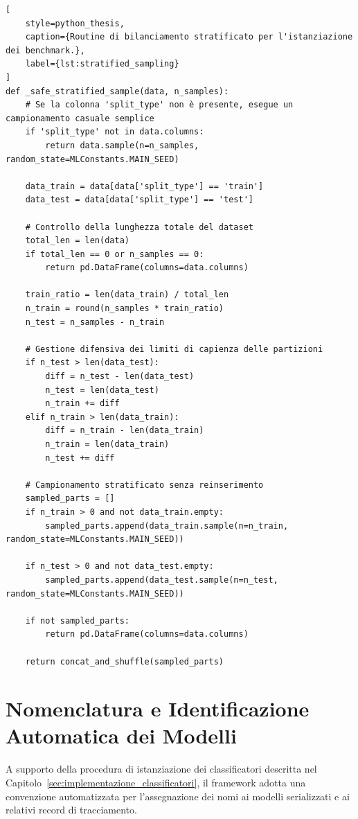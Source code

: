 \begin{lstlisting}[
    style=python_thesis,
    caption={Routine di bilanciamento stratificato per l'istanziazione dei benchmark.},
    label={lst:stratified_sampling}
]
def _safe_stratified_sample(data, n_samples):
    # Se la colonna 'split_type' non è presente, esegue un campionamento casuale semplice
    if 'split_type' not in data.columns:
        return data.sample(n=n_samples, random_state=MLConstants.MAIN_SEED)
    
    data_train = data[data['split_type'] == 'train']
    data_test = data[data['split_type'] == 'test']
    
    # Controllo della lunghezza totale del dataset
    total_len = len(data)
    if total_len == 0 or n_samples == 0:
        return pd.DataFrame(columns=data.columns)
    
    train_ratio = len(data_train) / total_len
    n_train = round(n_samples * train_ratio)
    n_test = n_samples - n_train
    
    # Gestione difensiva dei limiti di capienza delle partizioni
    if n_test > len(data_test):
        diff = n_test - len(data_test)
        n_test = len(data_test)
        n_train += diff
    elif n_train > len(data_train):
        diff = n_train - len(data_train)
        n_train = len(data_train)
        n_test += diff
    
    # Campionamento stratificato senza reinserimento
    sampled_parts = []
    if n_train > 0 and not data_train.empty:
        sampled_parts.append(data_train.sample(n=n_train, random_state=MLConstants.MAIN_SEED))

    if n_test > 0 and not data_test.empty:
        sampled_parts.append(data_test.sample(n=n_test, random_state=MLConstants.MAIN_SEED))

    if not sampled_parts:
        return pd.DataFrame(columns=data.columns)
        
    return concat_and_shuffle(sampled_parts)
\end{lstlisting}



\section{Nomenclatura e Identificazione Automatica dei Modelli}
\label{app:nomenclatura_modelli}

A supporto della procedura di istanziazione dei classificatori descritta nel Capitolo~\ref{sec:implementazione_classificatori}, il framework adotta una convenzione automatizzata per l'assegnazione dei nomi ai modelli serializzati e ai relativi record di tracciamento.

